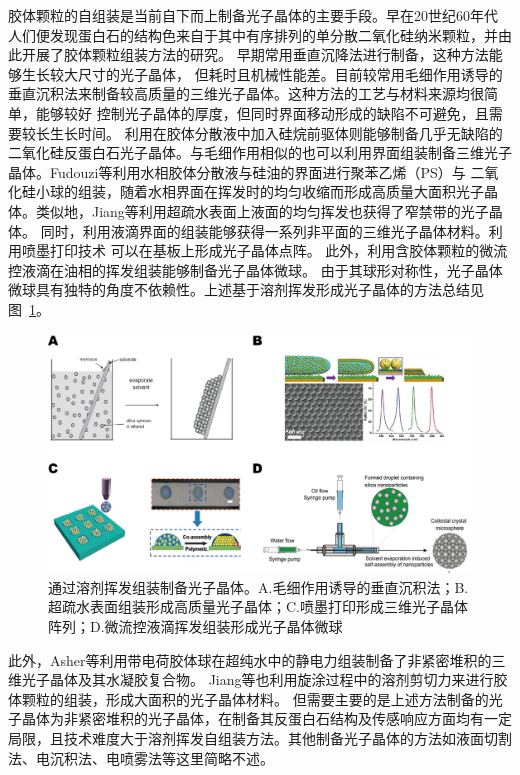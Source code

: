 胶体颗粒的自组装是当前自下而上制备光子晶体的主要手段。早在20世纪60年代
人们便发现蛋白石的结构色来自于其中有序排列的单分散二氧化硅纳米颗粒\cite{Darragh1966Origin,Iler1965Formation}，并由此开展了胶体颗粒组装方法的研究。
早期常用垂直沉降法进行制备\cite{Darragh1970Opaline}，这种方法能够生长较大尺寸的光子晶体，
但耗时且机械性能差。目前较常用毛细作用诱导的垂直沉积法来制备较高质量的三维光子晶体\cite{Jiang1999SingleCrystal}。这种方法的工艺与材料来源均很简单，能够较好
控制光子晶体的厚度，但同时界面移动形成的缺陷不可避免，且需要较长生长时间。
利用在胶体分散液中加入硅烷前驱体则能够制备几乎无缺陷的二氧化硅反蛋白石光子晶体\cite{Hatton2010Assembly}。与毛细作用相似的也可以利用界面组装制备三维光子晶体。Fudouzi等利用水相胶体分散液与硅油的界面进行聚苯乙烯（PS）与
二氧化硅小球的组装\cite{Fudouzi2004Fabricating,Fudouzi2007Novel}，随着水相界面在挥发时的均匀收缩而形成高质量大面积光子晶体。类似地，Jiang等利用超疏水表面上液面的均匀挥发也获得了窄禁带的光子晶体\cite{Huang2012Colloidal}。
同时，利用液滴界面的组装能够获得一系列非平面的三维光子晶体材料。利用喷墨打印技术
可以在基板上形成光子晶体点阵\cite{Cui2009Fabrication,Wang2012Inkjet}。
此外，利用含胶体颗粒的微流控液滴在油相的挥发组装能够制备光子晶体微球\cite{Sun2008Fabrication,Zhao2014Spherical}。
由于其球形对称性，光子晶体微球具有独特的角度不依赖性\cite{Gu2013Tailoring}。上述基于溶剂挥发形成光子晶体的方法总结见图~\ref{fig:evap_opal}。
\begin{figure}[htbp]
	\centering
	\includegraphics[width=0.8\linewidth]{figures/evap-opal.png}
	\caption{通过溶剂挥发组装制备光子晶体。A.毛细作用诱导的垂直沉积法\cite{Norris2004Opaline}；B.超疏水表面组装形成高质量光子晶体\cite{Huang2012Colloidal}；C.喷墨打印形成三维光子晶体阵列\cite{Wang2012Inkjet}；D.微流控液滴挥发组装形成光子晶体微球\cite{Cui2014Inverse}}
	\label{fig:evap_opal}
\end{figure}

此外，Asher等利用带电荷胶体球在超纯水中的静电力组装制备了非紧密堆积的三维光子晶体及其水凝胶复合物\cite{Lee2000Photonic,Muscatello2008PolyVinyl}。
Jiang等也利用旋涂过程中的溶剂剪切力来进行胶体颗粒的组装，形成大面积的光子晶体材料\cite{Jiang2004LargeScale}。
但需要主要的是上述方法制备的光子晶体为非紧密堆积的光子晶体，在制备其反蛋白石结构及传感响应方面均有一定局限，且技术难度大于溶剂挥发自组装方法。其他制备光子晶体的方法如液面切割法\cite{Yang2010LargeScale}、电沉积法\cite{Arpin2011Electrodeposited}、电喷雾法\cite{Shen2010Fabrication}等这里简略不述。

